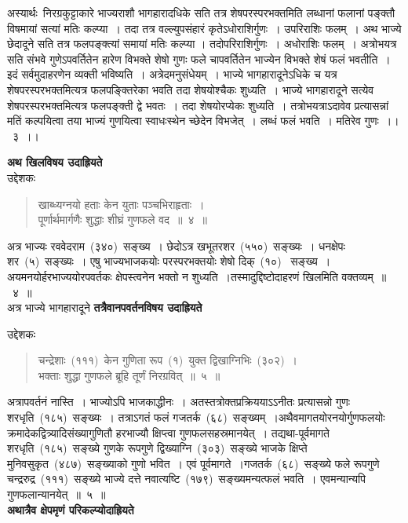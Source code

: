 \documentclass[11pt, openany]{book}
\begin{document}
\indent
अस्यार्थः\textendash\ निरग्रकुट्टाकारे भाज्यराशौ भागहारादधिके सति तत्र शेषपरस्परभक्तमिति लब्धानां फलानां पङ्क्तौ विषमायां सत्यां मतिः कल्प्या~। तदा तत्र वल्ल्युपसंहारं कृतेऽधोराशिर्गुणः~। उपरिराशिः फलम्~। अथ भाज्ये छेदादूने सति तत्र फलपङ्क्त्यां समायां मतिः कल्प्या । तदोपरिराशिर्गुणः~। अधोराशिः फलम्~। अत्रोभयत्र सति संभवे गुणेऽपवर्तितेन हारेण विभक्ते शेषो गुणः फले चापवर्तितेन भाज्येन विभक्ते शेषं फलं भवतीति~। इदं सर्वमुदाहरणेन व्यक्ती भविष्यति~। अत्रेदमनुसंधेयम्~। भाज्ये भागहारादूनेऽधिके च यत्र शेषपरस्परभक्तमित्यत्र फलपङ्क्तिरेका भवति तदा शेषयोश्चैकः शुध्यति~। भाज्ये भागहारादूने सत्येव शेषपरस्परभक्तमित्यत्र फलपङ्क्ती द्वे भवतः~। तदा शेषयोरप्येकः शुध्यति~। तत्रोभयत्राऽदावेव प्रत्यासन्नां मतिं कल्पयित्वा तया भाज्यं गुणयित्वा स्वाधःस्थेन च्छेदेन विभजेत्~। लब्धं फलं भवति~। मतिरेव गुणः~।।~३~।।


\newpage
\thispagestyle{fancy}
\fancyhf{}

\indent
\textbf{अथ खिलविषय उदाह्रियते \textendash}\\

उद्देशकः \textendash
\begin{quote}
{\ku खाब्ध्यग्नयो हताः केन युताः पञ्चभिराहृताः~।\\
पूर्णार्थमार्गणैः शुद्धाः शीघ्रं गुणफले वद~॥~४~॥}
\end{quote}
\indent
अत्र भाज्यः रववेदराम~(३४०)~सङ्ख्य~। छेदोऽत्र खभूतरशर~(५५०)~सङ्ख्यः~। धनक्षेपः शर~(५)~सङ्ख्यः~। एषु भाज्यभाजकयोः परस्परभक्तयोः शेषो दिक्~(१०)~ सङ्ख्य~। अयमनयोर्हरभाज्ययोरपवर्तकः क्षेपस्त्वनेन भक्तो न शुध्यति~।तस्मादुद्दिष्टोदाहरणं खिलमिति वक्तव्यम्~॥~४~॥\\
अत्र भाज्ये भागहारादूने \textbf{तत्रैवानपवर्तनविषय उदाह्रियते \textendash\\}

उद्देशकः \textendash 
\begin{quote}
{\ku चन्द्रेशाः~(१११)~केन गुणिता रूप~(१)~युक्त द्विखाग्निभिः~(३०२)~।\\
भक्ताः शुद्धा गुणफले ब्रूहि तूर्णं निरग्रवित्~॥~५~॥}
\end{quote}
\indent
अत्रापवर्तनं नास्ति~। भाज्योऽपि भाजकाद्धीनः~। अतस्तत्रोक्तप्रक्रिययाऽऽनीतः प्रत्यासन्नो गुणः शरधृति~(१८५)~सङ्ख्यः~। तत्राऽगतं फलं गजतर्क~(६८)~सङ्ख्यम्~।अथैवमागतयोरनयोर्गुणफलयोः क्रमादेकद्वित्र्यादिसंख्यागुणितौ हरभाज्यौ क्षिप्त्वा गुणफलसहस्रमानयेत्~। तद्यथा-पूर्वमागते शरधृति~(१८५)~सङ्ख्ये गुणके रूपगुणे द्विख्याग्नि~(३०३)~सङ्ख्ये भाजके क्षिप्ते मुनिवसुकृत~(४८७)~सङ्ख्याको गुणो भवित~। एवं पूर्वमागते~।गजतर्क~(६८)~सङ्ख्ये फले रूपगुणे चन्द्ररुद्र~(१११)~सङ्ख्ये भाज्ये दत्ते नवात्यष्टि~(१७९)~सङ्ख्यमन्यत्फलं भवति~। एवमन्यान्यपि गुणफलान्यानयेत्~॥~५~॥\\
\textbf{अथात्रैव क्षेपमृणं परिकल्प्योदाह्रियते\textendash\\ }
\end{document}
